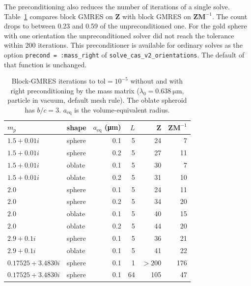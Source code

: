 \documentclass[11pt,a4paper]{article}
\begin{document}
The preconditioning also reduces the number of iterations of a single
solve.
Table~\ref{tab:shift-precond} compares block GMRES on $\mathbf{Z}$ with
block GMRES on $\mathbf{Z}\mathbf{M}^{-1}$.
The count drops to between 0.23 and 0.59 of the unpreconditioned one.
For the gold sphere with one orientation the unpreconditioned solver
did not reach the tolerance within 200 iterations.
This preconditioner is available for ordinary solves as the option
\texttt{precond = :mass\_right} of
\texttt{solve\_cas\_v2\_orientations}.
The default of that function is unchanged.

\begin{table}[htbp]
  \centering
  \caption{Block-GMRES iterations to
           $\text{tol} = 10^{-5}$ without and with right
           preconditioning by the mass matrix
           ($\lambda_0 = \SI{0.638}{\micro\meter}$, particle in
           vacuum, default mesh rule).
           The oblate spheroid has $b/c = 3$.
           $a_{\text{eq}}$ is the volume-equivalent radius.}
  \label{tab:shift-precond}
  \vspace{0.6ex}
  \begin{tabular}{llrrrr}
    \toprule
    $m_p$ & shape & $a_{\text{eq}}$ (\si{\micro\meter}) & $L$
      & $\mathbf{Z}$ & $\mathbf{Z}\mathbf{M}^{-1}$ \\
    \midrule
    $1.5 + 0.01i$ & sphere & 0.1 & 5 & 24 & 7 \\
    $1.5 + 0.01i$ & sphere & 0.2 & 5 & 27 & 11 \\
    $1.5 + 0.01i$ & oblate & 0.1 & 5 & 30 & 7 \\
    $1.5 + 0.01i$ & oblate & 0.2 & 5 & 31 & 10 \\
    $2.0$         & sphere & 0.1 & 5 & 24 & 11 \\
    $2.0$         & sphere & 0.2 & 5 & 34 & 20 \\
    $2.0$         & oblate & 0.1 & 5 & 40 & 15 \\
    $2.0$         & oblate & 0.2 & 5 & 44 & 20 \\
    $2.9 + 0.1i$  & sphere & 0.1 & 5 & 36 & 21 \\
    $2.9 + 0.1i$  & oblate & 0.1 & 5 & 41 & 22 \\
    $0.17525 + 3.4830i$ & sphere & 0.1 & 1  & $>200$ & 176 \\
    $0.17525 + 3.4830i$ & sphere & 0.1 & 64 & 105 & 47 \\
    \bottomrule
  \end{tabular}
\end{table}
\end{document}
